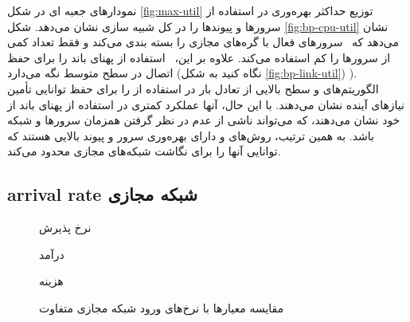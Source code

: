   نمودارهای جعبه ای در شکل
   \ref {fig:max-util} 
   توزیع حداکثر بهره‌وری در استفاده از سرورها و پیوندها را در کل شبیه سازی نشان می‌دهد. شکل
   \ref {fig:bp-cpu-util} 
   نشان می‌دهد که \ourAlg\ سرورهای فعال با گره‌های مجازی را بسته بندی می‌کند و فقط تعداد کمی از سرورها را کم استفاده می‌کند. علاوه بر این‌، \ourAlg\ استفاده از پهنای باند را برای حفظ اتصال در سطح متوسط ​​نگه می‌دارد (نگاه کنید به شکل
    \ref {fig:bp-link-util})
    ). الگوریتم‌های  و  سطح بالایی از تعادل بار در استفاده از  را برای حفظ توانایی تأمین نیازهای آینده نشان می‌دهند. با این حال‌، آنها عملکرد کمتری در استفاده از پهنای باند از خود نشان می‌دهند‌، که می‌تواند ناشی از عدم در نظر گرفتن همزمان سرورها و شبکه باشد. به همین ترتیب‌، روش‌های  و دارای بهره‌وری سرور و پیوند بالایی هستند که توانایی آنها را برای نگاشت شبکه‌های مجازی محدود می‌کند.
    
    \subsection{\gls{arrival rate} شبکه مجازی}
    
    \begin{figure}[t]
    	\centering
    	\begin{minipage}{.3\linewidth}
    		\centering
    		\resizebox{\linewidth}{!}{%
    			
    		}%
    		\caption{نرخ پذیرش}
    		\label{fig:diff-load-ar}
    	\end{minipage}
    	\hfil
    	\begin{minipage}{.3\linewidth}
    		\centering
    		\resizebox{\linewidth}{!}{%
    			
    		}%
    		\caption{درآمد}
    		\label{fig:diff-load-rev}
    	\end{minipage} 
    	\begin{minipage}{.3\linewidth}
    		\centering
    		\resizebox{\linewidth}{!}{%
    			
    		}%
    		\caption{هزینه}
    		\label{fig:diff-load-cost}
    	\end{minipage}
    	\caption{مقایسه معیارها با نرخ‌های ورود شبکه‌ مجازی متفاوت}
    	\label{fig:diff-load}
    \end{figure}
    
